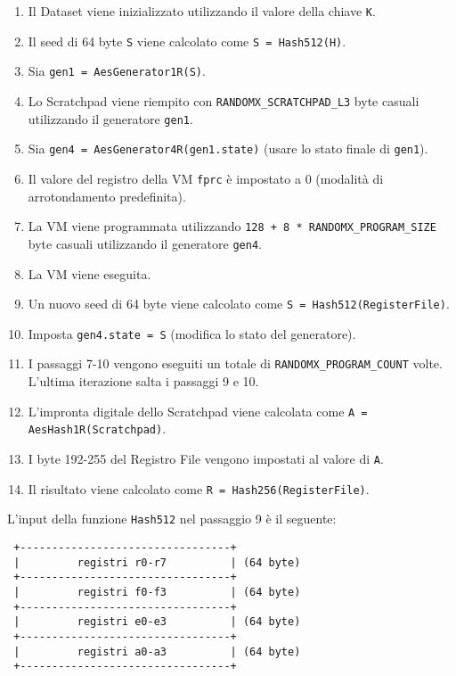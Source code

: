 \begin{enumerate}
    \item Il Dataset viene inizializzato utilizzando il valore della chiave \texttt{K}.
    \item Il seed di 64 byte \texttt{S} viene calcolato come \texttt{S = Hash512(H)}.
    \item Sia \texttt{gen1 = AesGenerator1R(S)}.
    \item Lo Scratchpad viene riempito con \texttt{RANDOMX\_SCRATCHPAD\_L3} byte casuali utilizzando il generatore \texttt{gen1}.
    \item Sia \texttt{gen4 = AesGenerator4R(gen1.state)} (usare lo stato finale di \texttt{gen1}).
    \item Il valore del registro della VM \texttt{fprc} è impostato a 0 (modalità di arrotondamento predefinita).
    \item La VM viene programmata utilizzando \texttt{128 + 8 * RANDOMX\_PROGRAM\_SIZE} byte casuali utilizzando il generatore \texttt{gen4}.
    \item La VM viene eseguita.
    \item Un nuovo seed di 64 byte viene calcolato come \texttt{S = Hash512(RegisterFile)}.
    \item Imposta \texttt{gen4.state = S} (modifica lo stato del generatore).
    \item I passaggi 7-10 vengono eseguiti un totale di \texttt{RANDOMX\_PROGRAM\_COUNT} volte. L'ultima iterazione salta i passaggi 9 e 10.
    \item L'impronta digitale dello Scratchpad viene calcolata come \texttt{A = AesHash1R(Scratchpad)}.
    \item I byte 192-255 del Registro File vengono impostati al valore di \texttt{A}.
    \item Il risultato viene calcolato come \texttt{R = Hash256(RegisterFile)}. 
    \\
\end{enumerate}

\noindent
L'input della funzione \texttt{Hash512} nel passaggio 9 è il seguente:

\begin{verbatim}
 +---------------------------------+
 |         registri r0-r7          | (64 byte)
 +---------------------------------+
 |         registri f0-f3          | (64 byte)
 +---------------------------------+
 |         registri e0-e3          | (64 byte)
 +---------------------------------+
 |         registri a0-a3          | (64 byte)
 +---------------------------------+
\end{verbatim}

